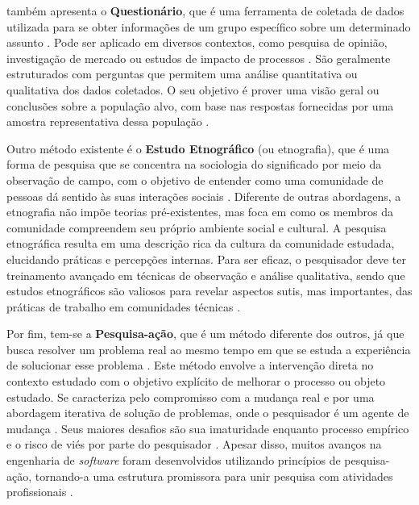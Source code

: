  também apresenta o \textbf{Questionário}, que é uma ferramenta de coletada de dados utilizada para se obter informações de um grupo específico sobre um determinado assunto \cite{pfleeger1994experimental}. Pode ser aplicado em diversos contextos, como pesquisa de opinião, investigação de mercado ou estudos de impacto de processos \cite{karlstrom2002aggregating}. São geralmente estruturados com perguntas que permitem uma análise quantitativa ou qualitativa dos dados coletados. O seu objetivo é prover uma visão geral ou conclusões sobre a população alvo, com base nas respostas fornecidas por uma amostra representativa dessa população \cite{babbie1990survey}.

Outro método existente é o \textbf{Estudo Etnográfico} (ou etnografia), que é uma forma de pesquisa que se concentra na sociologia do significado por meio da observação de campo, com o objetivo de entender como uma comunidade de pessoas dá sentido às suas interações sociais \cite{robinson2007ethnographically}. Diferente de outras abordagens, a etnografia não impõe teorias pré-existentes, mas foca em como os membros da comunidade compreendem seu próprio ambiente social e cultural. A pesquisa etnográfica resulta em uma descrição rica da cultura da comunidade estudada, elucidando práticas e percepções internas. Para ser eficaz, o pesquisador deve ter treinamento avançado em técnicas de observação e análise qualitativa, sendo que estudos etnográficos são valiosos para revelar aspectos sutis, mas importantes, das práticas de trabalho em comunidades técnicas \cite{Easterbrook2008}.

Por fim, tem-se a \textbf{Pesquisa-ação}, que é um método diferente dos outros, já que busca resolver um problema real ao mesmo tempo em que se estuda a experiência de solucionar esse problema \cite{davison2004principles}. Este método envolve a intervenção direta no contexto estudado com o objetivo explícito de melhorar o processo ou objeto estudado. Se caracteriza pelo compromisso com a mudança real e por uma abordagem iterativa de solução de problemas, onde o pesquisador é um agente de mudança \cite{Easterbrook2008}. Seus maiores desafios são sua imaturidade enquanto processo empírico e o risco de viés por parte do pesquisador \cite{lau1999towards}. Apesar disso, muitos avanços na engenharia de \textit{software} foram desenvolvidos utilizando princípios de pesquisa-ação, tornando-a uma estrutura promissora para unir pesquisa com atividades profissionais \cite{Easterbrook2008}.

